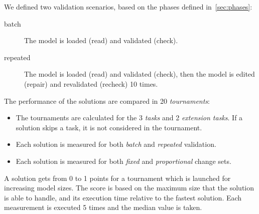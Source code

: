 \documentclass[submission,copyright,creativecommons]{eptcs}
\begin{document}
We defined two validation scenarios, based on the phases defined in~\autoref{sec:phases}:

\begin{description}
	\item[batch] The model is loaded (\textsf{read}) and validated (\textsf{check}).
	\item[repeated] The model is loaded (\textsf{read}) and validated (\textsf{check}), then the model is edited (\textsf{repair}) and revalidated (\textsf{recheck}) 10 times.
\end{description}

The performance of the solutions are compared in 20 \emph{tournaments}:

\begin{itemize}
	\item The tournaments are calculated for the 3 \emph{tasks} and 2 \emph{extension tasks}. If a solution skips a task, it is not considered in the tournament.
	\item Each solution is measured for both \emph{batch} and \emph{repeated} validation.
	\item Each solution is measured for both \emph{fixed} and \emph{proportional} change sets.
\end{itemize}

A solution gets from 0 to 1 points for a tournament which is launched for increasing model sizes. The score is based on the maximum size that the solution is able to handle, and its execution time relative to the fastest solution. Each measurement is executed 5 times and the median value is taken.
\end{document}

